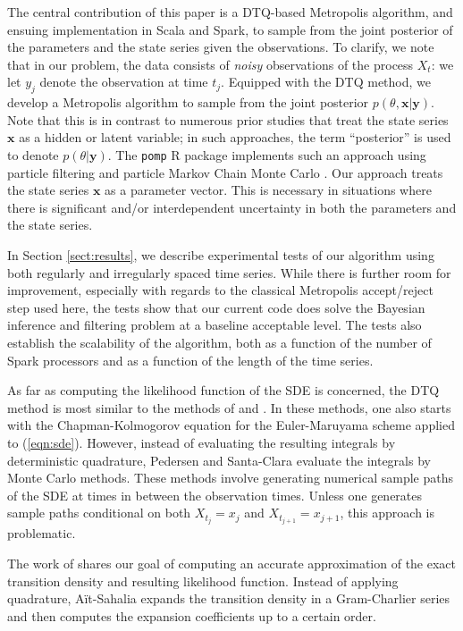 \documentclass[wcp]{jmlr}
\begin{document}
The central contribution of this paper is a DTQ-based Metropolis algorithm, and
ensuing implementation in Scala and Spark, to sample from the joint posterior of the parameters and the
state series given the observations.   To clarify, we note that in our problem, the data consists of \emph{noisy} observations of the
process $X_t$: we let $y_j$ denote the observation at time $t_j$.
Equipped with the DTQ method, we develop a Metropolis algorithm to
sample from the joint posterior $p(\theta, \mathbf{x} |
\mathbf{y})$.  Note
that this is in contrast to numerous prior studies that treat the
state series $\mathbf{x}$ as a hidden or latent variable; in such
approaches, the term ``posterior'' is used to denote $p(\theta |
\mathbf{y})$.  The \texttt{pomp} R package implements such an approach using
particle filtering and particle Markov Chain Monte Carlo \citep{pomp}.  Our approach treats the state series
$\mathbf{x}$ as a parameter vector.  This is necessary in situations
where there is significant and/or interdependent uncertainty in both
the parameters and the state series.

In Section \ref{sect:results}, we describe experimental tests of our
algorithm using both regularly and irregularly spaced time series.
While there is further room for improvement, especially with regards
to the classical Metropolis accept/reject step used here, the tests show
that our current code does solve the Bayesian inference and filtering
problem at a baseline acceptable level.  The tests also establish the
scalability of the algorithm, both as a function of the number of
Spark processors and as a function of the length of the time series.

As far as computing the likelihood function of the SDE is concerned,
the DTQ method is most similar to the methods of \cite{Pedersen1995} and
\cite{SantaClara1997}.  In these methods, one also starts with the
Chapman-Kolmogorov equation for the Euler-Maruyama scheme applied to
(\ref{eqn:sde}).  However, instead of evaluating the resulting
integrals by deterministic quadrature, Pedersen and Santa-Clara
evaluate the integrals by Monte Carlo methods.  These methods involve
generating numerical sample paths of the SDE at times in between the
observation times.  Unless one generates sample paths conditional on
both $X_{t_j} = x_j$ and  $X_{t_{j+1}} = x_{j+1}$, this approach is problematic.

The work of \cite{Sahaliaclosedform} shares our goal of computing an accurate approximation of the exact transition density and resulting likelihood function.  Instead of applying quadrature, A\"it-Sahalia expands the transition density in a Gram-Charlier series and then computes the expansion coefficients up to a certain order.  
\end{document}
